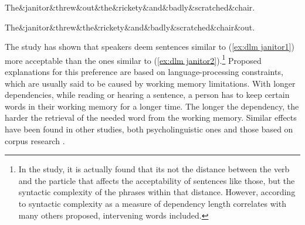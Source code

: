 \begin{exe}
    \ex
    \label{ex:dlm janitor}
    \begin{xlist}
    \ex
    \label{ex:dlm janitor1}
    \begin{dependency}[theme = simple, segmented edge, baseline=-\the\dimexpr\fontdimen22\textfont2\relax]
        \begin{deptext}
        The\&janitor\&threw\&out\&the\&rickety\&and\&badly\&scratched\&chair.\\
        \end{deptext}
    \end{dependency}

    \ex
    \label{ex:dlm janitor2}
    \begin{dependency}[theme = simple, segmented edge, edge height = 4ex, baseline=-\the\dimexpr\fontdimen22\textfont2\relax]
        \begin{deptext}
        The\&janitor\&threw\&the\&rickety\&and\&badly\&scratched\&chair\&out.\\
        \end{deptext}
    \end{dependency}
    \end{xlist}
\end{exe}

The study has shown that speakers deem sentences similar to (\ref{ex:dlm janitor1}) more acceptable than the ones similar to (\ref{ex:dlm janitor2}).\footnote{In the study, it is actually found that its not the distance between the verb and the particle that affects the acceptability of sentences like those, but the syntactic complexity of the phrases within that distance. However, according to \cite{wasow2002postverbal} syntactic complexity as a measure of dependency length correlates with many others proposed, intervening words included.} Proposed explanations for this preference are based on language-processing constraints, which are usually said to be caused by working memory limitations. With longer dependencies, while reading or hearing a sentence, a person has to keep certain words in their working memory for a longer time. The longer the dependency, the harder the retrieval of the needed word from the working memory. Similar effects have been found in other studies, both psycholinguistic ones \citep{GIBSON19981, KING1991580} and those based on corpus research \citep{dyer-2023, gildea-temperley-2007-optimizing, gildea-temperley-2010}. 

